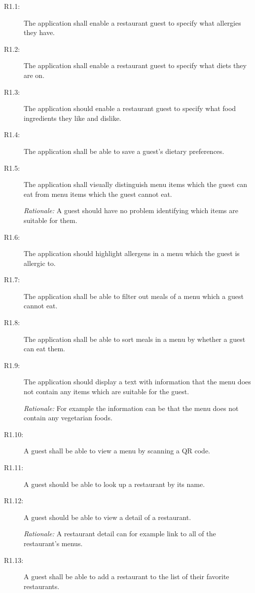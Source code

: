 \begin{description}
    \item [R1.1:] The application shall enable a restaurant guest to specify what allergies they have.
    \item [R1.2:] The application shall enable a restaurant guest to specify what diets they are on.
    \item [R1.3:] The application should enable a restaurant guest to specify what food ingredients they like and dislike.
    \item [R1.4:] The application shall be able to save a guest's dietary preferences.
    \item [R1.5:] The application shall visually distinguish menu items which the guest can eat from menu items which the guest cannot eat.

    \emph{Rationale:} A guest should have no problem identifying which items are suitable for them. 
    \item [R1.6:] The application should highlight allergens in a menu which the guest is allergic to.
    \item [R1.7:] The application shall be able to filter out meals of a menu which a guest cannot eat.
    \item [R1.8:] The application shall be able to sort meals in a menu by whether a guest can eat them.
    \item [R1.9:] The application should display a text with information that the menu does not contain any items which are suitable for the guest.

    \emph{Rationale:} For example the information can be that the menu does not contain any vegetarian foods.
    \item [R1.10:] A guest shall be able to view a menu by scanning a QR code.
    \item [R1.11:] A guest should be able to look up a restaurant by its name.
    \item [R1.12:] A guest should be able to view a detail of a restaurant.

    \emph{Rationale:} A restaurant detail can for example link to all of the restaurant's menus. 
    \item [R1.13:] A guest shall be able to add a restaurant to the list of their favorite restaurants.
    

\end{description}
